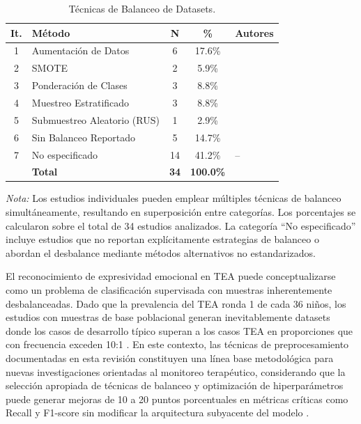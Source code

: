 \documentclass[3p,twocolumn,times]{elsarticle}
\begin{document}
	\begin{table}[!ht]
		\centering
		\caption{Técnicas de Balanceo de Datasets.}\label{tab15}
		\begin{tabular}{cp{3cm}ccp{4cm}}
			\toprule
			\textbf{It.} & \textbf{Método} & \textbf{N} & \textbf{\%} & \textbf{Autores} \\
			\midrule
			1 & Aumentación de Datos         & 6  & 17.6\% &
			\cite{Shaik2025,Radocaj2025,Sholikah2024,Aljbori2025,Ramachandran2025,Hosney2024} \\
			2 & SMOTE                        & 2  & 5.9\%  & \cite{Radocaj2025,Alam2025} \\
			3 & Ponderación de Clases        & 3  & 8.8\%  & \cite{Johnson2025,Washington2022,Alam2025} \\
			4 & Muestreo Estratificado       & 3  & 8.8\%  & \cite{Radocaj2025,Rhatassi2025,Ramachandran2025} \\
			5 & Submuestreo Aleatorio (RUS)  & 1  & 2.9\%  & \cite{Alam2025} \\
			6 & Sin Balanceo Reportado       & 5  & 14.7\% &
			\cite{Ahmad2024,Levy2024,Alsubai2025,Almeida2019,Nagae2022} \\
			7 & No especificado              & 14 & 41.2\% & -- \\
			& \textbf{Total}               & \textbf{34} & \textbf{100.0\%} & \\
			\bottomrule
		\end{tabular}
		\begin{minipage}{\textwidth}
			\vspace{6pt}
			\small\textit{Nota:} Los estudios individuales pueden emplear múltiples técnicas de
			balanceo simultáneamente, resultando en superposición entre categorías. Los
			porcentajes se calcularon sobre el total de 34 estudios analizados. La categoría
			``No especificado'' incluye estudios que no reportan explícitamente estrategias de
			balanceo o abordan el desbalance mediante métodos alternativos no estandarizados.
		\end{minipage}
	\end{table}
	
	El reconocimiento de expresividad emocional en TEA puede conceptualizarse como un
	problema de clasificación supervisada con muestras inherentemente desbalanceadas.
	Dado que la prevalencia del TEA ronda 1 de cada 36 niños, los estudios con muestras
	de base poblacional generan inevitablemente datasets donde los casos de desarrollo
	típico superan a los casos TEA en proporciones que con frecuencia exceden 10:1 \cite{Shaik2025}. En este contexto, las técnicas de preprocesamiento documentadas en esta revisión constituyen una línea base metodológica para nuevas investigaciones orientadas al
	monitoreo terapéutico, considerando que la selección apropiada de técnicas de
	balanceo y optimización de hiperparámetros puede generar mejoras de 10 a 20 puntos
	porcentuales en métricas críticas como Recall y F1-score sin modificar la
	arquitectura subyacente del modelo \cite{Alam2025}.
	
\end{document}
